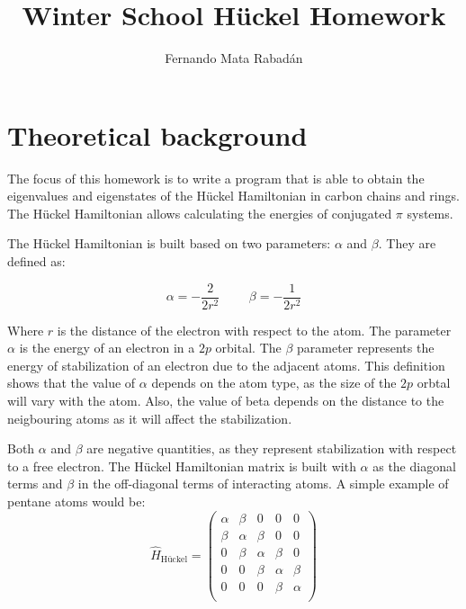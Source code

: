 \documentclass{article}
\title{Winter School Hückel Homework}
\author{Fernando Mata Rabadán}
\date{}
\begin{document}
\maketitle


\section{Theoretical background}
The focus of this homework is to write a program that is able to obtain the eigenvalues and eigenstates of the Hückel Hamiltonian in carbon chains and rings. The Hückel Hamiltonian allows calculating the energies of conjugated $\pi$ systems. 

The Hückel Hamiltonian is built based on two parameters: $\alpha$ and $\beta$. They are defined as:

\begin{equation} 
\alpha = -\frac{2}{2r^{2}}
\,\,\,\,\,\,\,\,\,\,\,\,\,\,
\beta = -\frac{1}{2r^{2}}
\end{equation} \label{eq:alpha_beta_equation}

Where $r$ is the distance of the electron with respect to the atom. The parameter $\alpha$ is the energy of an electron in a $2p$ orbital. The $\beta$ parameter represents the energy of stabilization of an electron due to the adjacent atoms. This definition shows that the value of $\alpha$ depends on the atom type, as the size of the $2p$ orbtal will vary with the atom. Also, the value of beta depends on the distance to the neigbouring atoms as it will affect the stabilization. 

Both $\alpha$ and $\beta$ are negative quantities, as they represent stabilization with respect to a free electron. The Hückel Hamiltonian matrix is built with $\alpha$ as the diagonal terms and $\beta$ in the off-diagonal terms of interacting atoms. A simple example of pentane atoms would be: 
\begin{equation}
    \hat{H}_{\textrm{Hückel}}  =
    \begin{pmatrix}
        \alpha & \beta & 0 & 0 & 0 \\
        \beta & \alpha & \beta & 0 & 0 \\
        0 & \beta & \alpha & \beta & 0 \\
        0 & 0 & \beta & \alpha & \beta \\
        0 & 0 & 0 & \beta & \alpha \\
    \end{pmatrix}
\end{equation}
    
\end{document}
